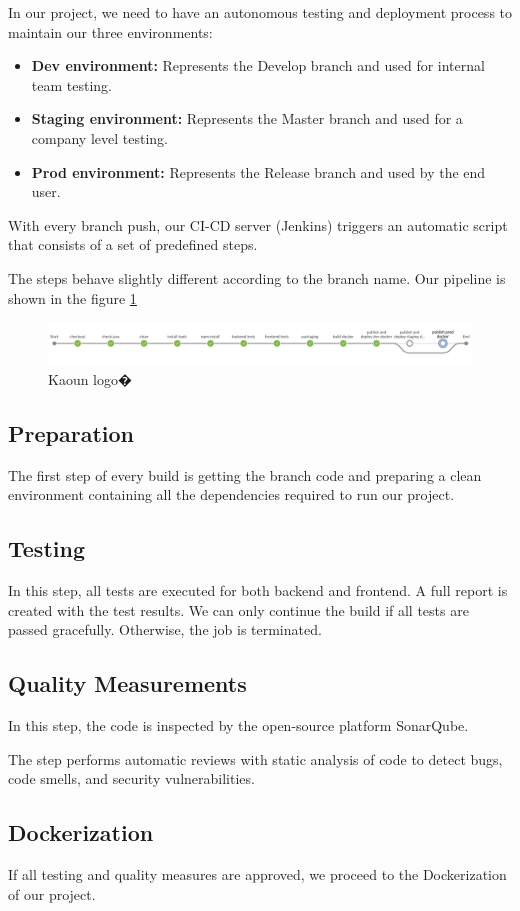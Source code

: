 \begin{spacing}{1.2}
In our project, we need to have an autonomous testing and deployment process to maintain our three environments:
\begin{itemize}
	\item \textbf{Dev environment:} Represents the Develop branch and used for internal team testing.
	\item \textbf{Staging environment:} Represents the Master branch and used for a company level testing.
    \item \textbf{Prod environment:} Represents the Release branch and used by the end user.
\end{itemize}

With every branch push, our CI-CD server (Jenkins) triggers an automatic script that consists of a set of predefined steps.

The steps behave slightly different according to the branch name.
Our pipeline is shown in the figure \ref{fig:jenkins}
\begin{figure}[!h]\centering
\includegraphics[scale=0.3]{jenkins.png}
\caption{Kaoun logo�}
\label{fig:jenkins}
\end{figure}
\subsection{Preparation}
The first step of every build is getting the branch code and preparing a clean environment containing all the dependencies required to run our project.
\subsection{Testing}
In this step, all tests are executed for both backend and frontend. A full report is created with the test results.
We can only continue the build if all tests are passed gracefully. Otherwise, the job is terminated.
\subsection{Quality Measurements}
In this step, the code is inspected by the open-source platform SonarQube.

The step performs automatic reviews with static analysis of code to detect bugs, code smells, and security vulnerabilities.
\subsection{Dockerization}
If all testing and quality measures are approved, we proceed to the Dockerization of our project.
\newline


\end{spacing}
